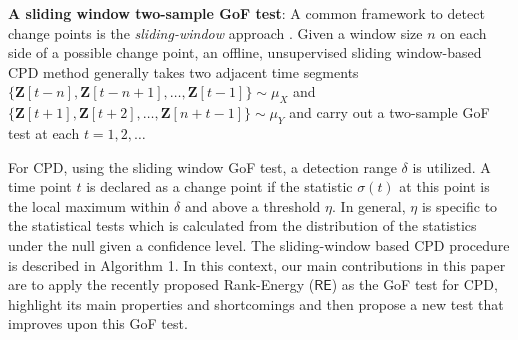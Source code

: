 \documentclass{article}
\begin{document}
\textbf{A sliding window two-sample GoF test}: A common framework to detect change points is the \textit{sliding-window} approach \cite{li2015scan}. Given a window size $n$ on each side of a possible change point, an offline, unsupervised sliding window-based CPD method generally takes two adjacent time segments {\small $\{\bm Z[t -n], \bm Z[t -n +1], \dots, \bm Z[t -1]\}\sim \mu_X$} and {\small $\{\bm Z[t + 1], \bm Z[t + 2], \dots, \bm Z[n + t - 1]\}\sim \mu_Y$} and carry out a two-sample GoF test at each $t=1, 2, \dots$ 




For CPD, using the sliding window GoF test, a detection range $\delta$ is utilized. A time point $t$ is declared as a change point if the statistic $\sigma(t)$ at this point is the local maximum within $\delta$ and above a threshold $\eta$. In general, $\eta$ is specific to the statistical tests which is calculated from the distribution of the statistics under the null given a confidence level. The sliding-window based CPD procedure is described in Algorithm 1. In this context, our main contributions in this paper are to apply the recently proposed Rank-Energy {\small ($\mathsf{RE}$)} \cite{deb2021multivariate} as the GoF test for CPD, highlight its main properties and shortcomings and then propose a new test that improves upon this GoF test. 
\end{document}
